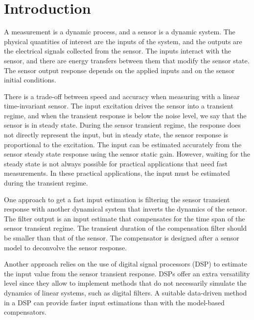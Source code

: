 \glsresetall

\chapter{Introduction} \label{chap:Introduction}


A measurement is a dynamic process, and a sensor is a dynamic system.
The physical quantities of interest are the inputs of the system, and the outputs are the electrical signals collected from the sensor.
The inputs interact with the sensor, and there are energy transfers between them that modify the sensor state.
The sensor output response depends on the applied inputs and on the sensor initial conditions.

There is a trade-off between speed and accuracy when measuring with a linear time-invariant sensor.
The input excitation drives the sensor into a transient regime, and when the transient response is below the noise level, we say that the sensor is in steady state.
During the sensor transient regime, the response does not directly represent the input, but 
in steady state, the sensor response is proportional to the excitation.
The input can be estimated accurately from the sensor steady state response using the sensor static gain.
However, waiting for the steady state is not always possible for practical applications that need fast measurements.
In these practical applications, the input must be estimated during the transient regime.

One approach to get a fast input estimation is filtering the sensor transient response with another dynamical system that inverts the dynamics of the sensor.
The filter output is an input estimate that compensates for the time span of the sensor transient regime.
The transient duration of the compensation filter should be smaller than that of the sensor.
The compensator is designed after a sensor model to deconvolve the sensor response.

Another approach relies on the use of digital signal processors (DSP) to estimate the input value from the sensor transient response.
DSPs offer an extra versatility level since they allow to implement methods that do not necessarily simulate the dynamics of linear systems, such as digital filters.
A suitable data-driven method in a DSP can provide faster input estimations than with the model-based compensators.

